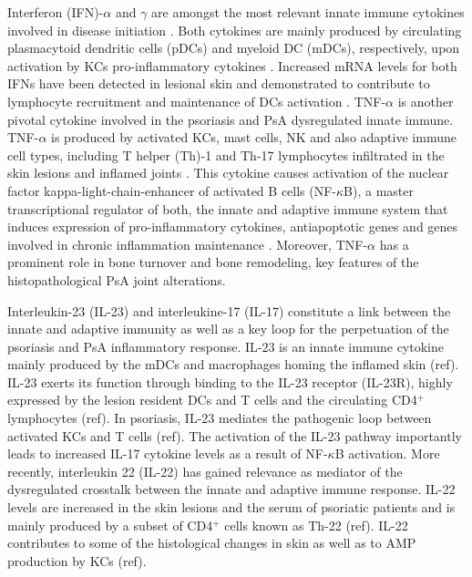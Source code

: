 Interferon (IFN)-$\alpha$ and $\gamma$ are amongst the most relevant innate immune cytokines involved in disease initiation \parencite{Leanne2009}. Both cytokines are mainly produced by circulating plasmacytoid dendritic cells (pDCs) and myeloid DC (mDCs), respectively, upon activation by KCs pro-inflammatory cytokines \parencite{Perera2012}. Increased mRNA levels for both IFNs have been detected in lesional skin and demonstrated to contribute to lymphocyte recruitment and maintenance of DCs activation \parencite{Schmid1994}. TNF-$\alpha$ is another pivotal cytokine involved in the psoriasis and PsA dysregulated innate immune. TNF-$\alpha$ is produced by activated KCs, mast cells, NK
 and also adaptive immune cell types, including T helper (Th)-1 and Th-17 lymphocytes infiltrated in the skin lesions and inflamed joints \parencite{Perera2012,Lizzul2005}. This cytokine causes activation of the nuclear factor kappa-light-chain-enhancer of activated B cells (NF-$\kappa$B), a master transcriptional regulator of both, the innate and adaptive immune system that induces expression of pro-inflammatory cytokines, antiapoptotic genes and genes involved in chronic inflammation maintenance \parencite{Lizzul2005, Johansen2010}. Moreover, TNF-$\alpha$ has a prominent role in bone turnover and bone remodeling, key features of the histopathological PsA joint alterations\parencite{Mensah2008}. 

Interleukin-23 (IL-23) and interleukine-17 (IL-17) constitute a link between the innate and adaptive immunity as well as a key loop for the perpetuation of the psoriasis and PsA inflammatory response. IL-23 is an innate immune cytokine mainly produced by the mDCs and macrophages homing the inflamed skin (ref). IL-23 exerts its function through binding to the IL-23 receptor (IL-23R), highly expressed by the lesion resident DCs and T cells and the circulating CD4$^+$ lymphocytes (ref). In psoriasis, IL-23 mediates the pathogenic loop between activated KCs and T cells (ref). The activation of the IL-23 pathway importantly leads to increased IL-17 cytokine levels as a result of NF-$\kappa$B activation. %
More recently, interleukin 22 (IL-22) has gained relevance as mediator of the dysregulated crosstalk between the innate and adaptive immune response. IL-22 levels are increased in the skin lesions and the serum of psoriatic patients and is mainly produced by a subset of CD4$^+$ cells known as Th-22 (ref). IL-22 contributes to some of the histological changes in skin as well as to AMP production by KCs (ref).

